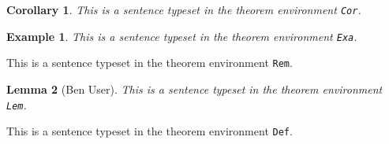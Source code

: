 \documentclass{article}
\theoremstyle{break} \newtheorem{Cor}{Corollary}
\theoremstyle{plain} \newtheorem{Exa}{Example}[section]
\theoremstyle{marginbreak} \newtheorem{Lem}[Cor]{Lemma}
\theoremstyle{change}
\begin{document}
\begin{Cor}
This is a sentence typeset in the theorem environment \texttt{Cor}.
\end{Cor}

\begin{Exa}
This is a sentence typeset in the theorem environment \texttt{Exa}.
\end{Exa}

\begin{Rem}
This is a sentence typeset in the theorem environment \texttt{Rem}.
\end{Rem}

\begin{Lem}[Ben User]
This is a sentence typeset in the theorem environment \texttt{Lem}.
\end{Lem}

\begin{Def}
This is a sentence typeset in the theorem environment \texttt{Def}.
\end{Def}
\end{document}

